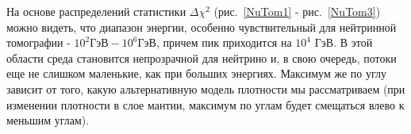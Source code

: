 На основе распределений статистики $\Delta\chi^2$ (рис.~\ref{NuTom1} - рис.~\ref{NuTom3}) можно видеть, что диапазон энергии, особенно чувствительный для нейтринной томографии  - $10^2 \text{ГэВ}-10^6 \text{ГэВ}$, причем пик приходится на $10^4 \text{ ГэВ}$. В этой области среда становится непрозрачной для нейтрино и, в свою очередь, потоки еще не слишком маленькие, как при больших энергиях. Максимум же по углу зависит от того, какую альтернативную модель плотности мы рассматриваем (при изменении плотности в слое мантии, максимум по углам будет смещаться влево к меньшим углам). 

